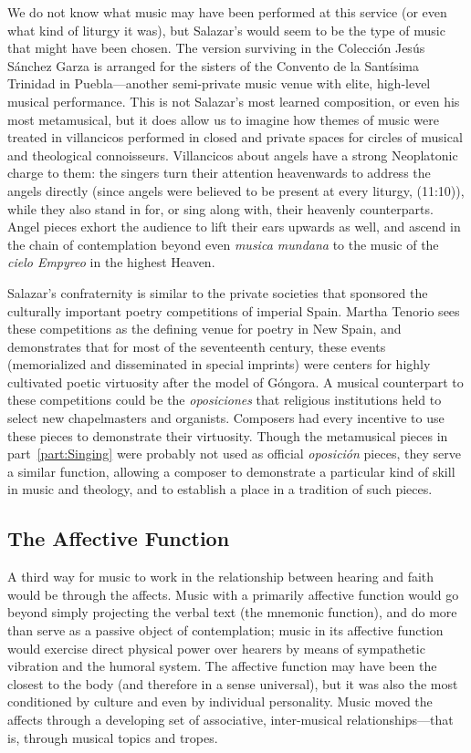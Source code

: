 We do not know what music may have been performed at this service (or even what kind of liturgy it was), but Salazar's  would seem to be the type of music that might have been chosen.
The version surviving in the Colección Jesús Sánchez Garza is arranged for the sisters of the Convento de la Santísima Trinidad in Puebla---another semi-private music venue with elite, high-level musical performance.
This is not Salazar's most learned composition, or even his most metamusical, but it does allow us to imagine how themes of music were treated in villancicos performed in closed and private spaces for circles of musical and theological connoisseurs.
Villancicos about angels have a strong Neoplatonic charge to them: the singers turn their attention heavenwards to address the angels directly (since angels were believed to be present at every liturgy, (11:10)), while they also stand in for, or sing along with, their heavenly counterparts.
Angel pieces exhort the audience to lift their ears upwards as well, and ascend in the chain of contemplation beyond even \emph{musica mundana} to the music of the \emph{cielo Empyreo} in the highest Heaven.

Salazar's confraternity is similar to the private societies that sponsored the culturally important poetry competitions of imperial Spain.
Martha Tenorio sees these competitions as the defining venue for poetry in New Spain, and demonstrates that for most of the seventeenth century, these events (memorialized and disseminated in special imprints) were centers for highly cultivated poetic virtuosity after the model of Góngora.%
	\autocite{Tenorio:PoesiaNovohispana}
A musical counterpart to these competitions could be the \emph{oposiciones} that religious institutions held to select new chapelmasters and organists.
Composers had every incentive to use these pieces to demonstrate their virtuosity.
Though the metamusical pieces in part~\ref{part:Singing} were probably not used as official \emph{oposición} pieces, they serve a similar function, allowing a composer to demonstrate a particular kind of skill in music and theology, and to establish a place in a tradition of such pieces.

\subsection{The Affective Function}

A third way for music to work in the relationship between hearing and faith would be through the affects.
Music with a primarily affective function would go beyond simply projecting the verbal text (the mnemonic function), and do more than serve as a passive object of contemplation; music in its affective function would exercise direct physical power over hearers by means of sympathetic vibration and the humoral system.
The affective function may have been the closest to the body (and therefore in a sense universal), but it was also the most conditioned by culture and even by individual personality.
Music moved the affects through a developing set of associative, inter-musical relationships---that is, through musical topics and tropes.

